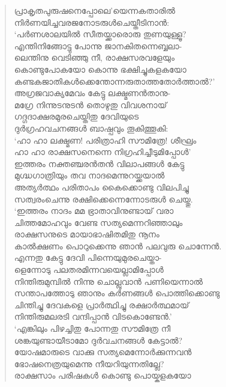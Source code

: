 \begin{verse}
പ്രാകൃതപുരുഷനെപ്പോലെ’യെന്നകതാരില്‍\\
നിര്‍ണയിച്ചവരജനോടരുള്‍ചെയ്തീടിനാന്‍:\\
‘പര്‍ണശാലയില്‍ സീതയ്ക്കാരൊരു തുണയുള്ളൂ?\\
എന്തിനിങ്ങോട്ടു പോന്നു ജാനകിതന്നെബ്ബലാ-\\
ലെന്തിനു വെടിഞ്ഞു നീ, രാക്ഷസരവളേയും\\
കൊണ്ടുപോകയോ കൊന്നു ഭക്ഷിച്ചുകളകയോ\\
കണ്ടകജാതികള്‍ക്കെന്തോന്നരുതാത്തതോര്‍ത്താല്‍?’\\
അഗ്രജവാക്യമേവം കേട്ടു ലക്ഷ്മണന്‍താനു-\\
മഗ്രേ നിന്നുടനുടന്‍ തൊഴുതു വിവശനായ്\\
ഗദ്ഗദാക്ഷരമുരചെയ്തിതു ദേവിയുടെ\\
ദുര്‍ഗ്രഹവചനങ്ങള്‍ ബാഷ്പവും തൂകിത്തൂകി:\\
‘ഹാ ഹാ ലക്ഷ്മണ! പരിത്രാഹി സൗമിത്രേ! ശീഘ്രം\\
ഹാ ഹാ രാക്ഷസനെന്നെ നിഗ്രഹിച്ചീടുമിപ്പോള്‍’\\
ഇത്തരം നക്തഞ്ചരന്‍തന്‍ വിലാപങ്ങള്‍ കേട്ടു\\
മുഗ്ദ്ധഗാത്രിയും തവ നാദമെന്നുറയ്ക്കയാല്‍\\
അത്യര്‍ത്ഥം പരിതാപം കൈക്കൊണ്ടു വിലപിച്ചു\\
സത്വരംചെന്നു രക്ഷിക്കെന്നെന്നോടരുള്‍ ചെയ്തു.\\
‘ഇത്തരം നാദം മമ ഭ്രാതാവിനുണ്ടായ് വരാ\\
ചിത്തമോഹവും വേണ്ട സത്യമെന്നറിഞ്ഞാലും\\
രാക്ഷസനുടെ മായാഭാഷിതമിതു നൂനം\\
കാല്‍ക്ഷണം പൊറുക്കെന്നു ഞാന്‍ പലവുരു ചൊന്നേന്‍.\\
എന്നതു കേട്ടു ദേവി പിന്നെയുമുരചെയ്താ-\\
ളെന്നോടു പലതരമിന്നവയെല്ലാമിപ്പോള്‍\\
നിന്തിരുമുമ്പില്‍ നിന്നു ചൊല്ലുവാന്‍ പണിയെന്നാല്‍\\
സന്താപത്തോടു ഞാനും കര്‍ണങ്ങള്‍ പൊത്തിക്കൊണ്ടു\\
ചിന്തിച്ചു ദേവകളെ പ്രാര്‍ത്ഥിച്ചു രക്ഷാര്‍ത്ഥമായ്\\
നിന്തിരുമലരടി വന്ദിപ്പാന്‍ വിടകൊണ്ടേന്‍.’\\
‘എങ്കിലും പിഴച്ചിതു പോന്നതു സൗമിത്രേ നീ\\
ശങ്കയുണ്ടായീടാമോ ദുര്‍വചനങ്ങള്‍ കേട്ടാല്‍?\\
യോഷമാരുടെ വാക്കു സത്യമെന്നോര്‍ക്കുന്നവന്‍\\
ഭോഷനെത്രയുമെന്നു നീയറിയുന്നതില്ലേ?\\
രാക്ഷസാം പരിഷകള്‍ കൊണ്ടു പൊയ്കളകയോ\\

\end{verse}
